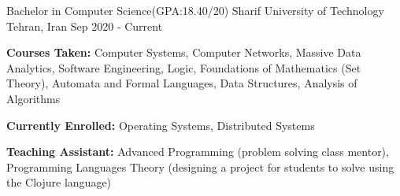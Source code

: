 

\begin{cventries}

  \cventry
  {Bachelor in Computer Science(GPA:18.40/20)} %
  {Sharif University of Technology} %
  {Tehran, Iran} %
  {Sep 2020 - Current} %
  {
    \begin{cvitems} %
      \item {\textbf{Courses Taken: }
          Computer Systems, Computer Networks, Massive Data Analytics, Software Engineering,
          Logic, Foundations of Mathematics (Set Theory), Automata and Formal Languages,
          Data Structures, Analysis of Algorithms
        }
\item {\textbf{Currently Enrolled: }
          Operating Systems, Distributed Systems
        }
      \item {\textbf{Teaching Assistant:} Advanced Programming (problem solving
          class mentor), Programming Languages Theory (designing a project for students to solve using the Clojure language)}
    \end{cvitems}
  }
\end{cventries}
